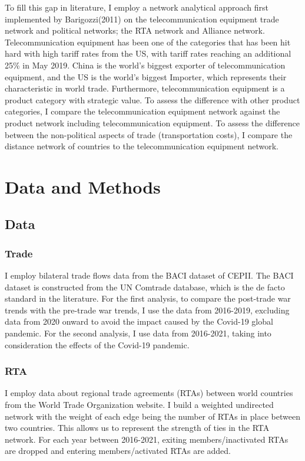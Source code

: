 \documentclass[a4paper, 12pt]{article}
\begin{document}
To fill this gap in literature, I employ a network analytical approach first implemented by Barigozzi(2011)\cite{barigozzi2011} on the telecommunication equipment trade network and political networks; the RTA network and Alliance network.
Telecommunication equipment has been one of the categories that has been hit hard with high tariff rates from the US, with tariff rates reaching an additional 25\% in May 2019.
China is the world’s biggest exporter of telecommunication equipment, and the US is the world’s biggest Importer, which represents their characteristic in world trade.
Furthermore, telecommunication equipment is a product category with strategic value.
To assess the difference with other product categories, I compare the telecommunication equipment network against the product network including telecommunication equipment.
To assess the difference between the non-political aspects of trade (transportation costs),  I compare the distance network of countries to the telecommunication equipment network.

\newpage

\section{Data and Methods}

\subsection{Data}

\subsubsection{Trade}

I employ bilateral trade flows data from the BACI dataset of CEPII\cite{CEPII}.
The BACI dataset is constructed from the UN Comtrade database, which is the de facto standard in the literature.
For the first analysis, to compare the post-trade war trends with the pre-trade war trends, I use the data from 2016-2019, excluding data from 2020 onward to avoid the impact caused by the Covid-19 global pandemic.
For the second analysis, I use data from 2016-2021, taking into consideration the effects of the Covid-19 pandemic.

\subsubsection{RTA}
I employ data about regional trade agreements (RTAs) between world countries from the World Trade Organization website\cite{RTA}.
I build a weighted undirected network with the weight of each edge being the number of RTAs in place between two countries.
This allows us to represent the strength of ties in the RTA network.
For each year between 2016-2021, exiting members/inactivated RTAs are dropped and entering members/activated RTAs are added.
\end{document}
